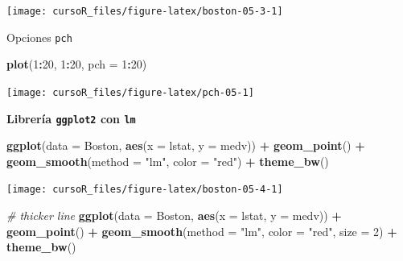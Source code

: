 \documentclass[]{book}
\newenvironment{Shaded}{\begin{snugshade}}{\end{snugshade}}
\newcommand{\KeywordTok}[1]{\textcolor[rgb]{0.13,0.29,0.53}{\textbf{#1}}}
\newcommand{\DataTypeTok}[1]{\textcolor[rgb]{0.13,0.29,0.53}{#1}}
\newcommand{\DecValTok}[1]{\textcolor[rgb]{0.00,0.00,0.81}{#1}}
\newcommand{\StringTok}[1]{\textcolor[rgb]{0.31,0.60,0.02}{#1}}
\newcommand{\CommentTok}[1]{\textcolor[rgb]{0.56,0.35,0.01}{\textit{#1}}}
\newcommand{\OperatorTok}[1]{\textcolor[rgb]{0.81,0.36,0.00}{\textbf{#1}}}
\newcommand{\NormalTok}[1]{#1}
\begin{document}
\begin{center}\texttt{[image: cursoR\_files/figure-latex/boston-05-3-1]} \end{center}

Opciones \texttt{pch}

\begin{Shaded}
\begin{Highlighting}[]
\KeywordTok{plot}\NormalTok{(}\DecValTok{1}\OperatorTok{:}\DecValTok{20}\NormalTok{, }\DecValTok{1}\OperatorTok{:}\DecValTok{20}\NormalTok{, }\DataTypeTok{pch =} \DecValTok{1}\OperatorTok{:}\DecValTok{20}\NormalTok{)}
\end{Highlighting}
\end{Shaded}

\begin{center}\texttt{[image: cursoR\_files/figure-latex/pch-05-1]} \end{center}

\textbf{Librería \texttt{ggplot2} con \texttt{lm}}

\begin{Shaded}
\begin{Highlighting}[]
\KeywordTok{ggplot}\NormalTok{(}\DataTypeTok{data =}\NormalTok{ Boston, }\KeywordTok{aes}\NormalTok{(}\DataTypeTok{x =}\NormalTok{ lstat, }\DataTypeTok{y =}\NormalTok{ medv)) }\OperatorTok{+}
\StringTok{  }\KeywordTok{geom_point}\NormalTok{() }\OperatorTok{+}
\StringTok{  }\KeywordTok{geom_smooth}\NormalTok{(}\DataTypeTok{method =} \StringTok{"lm"}\NormalTok{, }\DataTypeTok{color =} \StringTok{"red"}\NormalTok{) }\OperatorTok{+}
\StringTok{  }\KeywordTok{theme_bw}\NormalTok{()}
\end{Highlighting}
\end{Shaded}

\begin{center}\texttt{[image: cursoR\_files/figure-latex/boston-05-4-1]} \end{center}

\begin{Shaded}
\begin{Highlighting}[]
\CommentTok{# thicker line}
\KeywordTok{ggplot}\NormalTok{(}\DataTypeTok{data =}\NormalTok{ Boston, }\KeywordTok{aes}\NormalTok{(}\DataTypeTok{x =}\NormalTok{ lstat, }\DataTypeTok{y =}\NormalTok{ medv)) }\OperatorTok{+}
\StringTok{  }\KeywordTok{geom_point}\NormalTok{() }\OperatorTok{+}
\StringTok{  }\KeywordTok{geom_smooth}\NormalTok{(}\DataTypeTok{method =} \StringTok{"lm"}\NormalTok{, }\DataTypeTok{color =} \StringTok{"red"}\NormalTok{, }\DataTypeTok{size =} \DecValTok{2}\NormalTok{) }\OperatorTok{+}
\StringTok{  }\KeywordTok{theme_bw}\NormalTok{()}
\end{Highlighting}
\end{Shaded}
\end{document}
